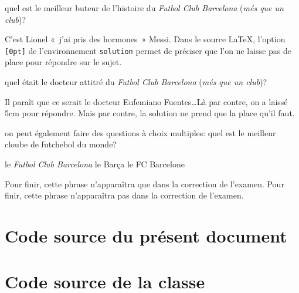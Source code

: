 \documentclass[addpoints,fr,biblatex,name,gradetable]{isae-exam}
\begin{document}
\begin{questions}
\question[1] quel est le meilleur buteur de l'histoire du \textit{Futbol
  Club Barcelona} (\textit{més que un club})?

\begin{solution}[0pt]

  C'est Lionel «~j'ai pris des hormones~» Messi. Dans le source
  \LaTeX, l'option \lstinline![0pt]! de l'environnement
  \lstinline!solution! permet de préciser que l'on ne laisse pas de
  place pour répondre sur le sujet.
\end{solution}

\question[1\half] quel était le docteur attitré du \textit{Futbol
  Club Barcelona} (\textit{més que un club})?

\begin{solution}[5cm]

  Il paraît que ce serait le docteur Eufemiano Fuentes\ldots Là par
  contre, on a laissé 5cm pour répondre. Mais par contre, la
  solution ne prend que la place qu'il faut.
\end{solution}

\question[\half] on peut également faire des questions à choix multiples:
quel est le meilleur cloube de futchebol du monde?

\begin{checkboxes}
  \CorrectChoice le \textit{Futbol Club Barcelona}
  \choice le Barça
  \choice le FC Barcelone
\end{checkboxes}
\end{questions}

\ifprintanswers
  Pour finir, cette phrase n'apparaîtra que dans la correction de l'examen.
\else
  Pour finir, cette phrase n'apparaîtra pas dans la correction de l'examen.
\fi

\section{Code source du présent document}
\label{sec:code-source-doc}



\section{Code source de la classe}
\label{sec:code-source-classe}



\printbibliography
\end{document}

